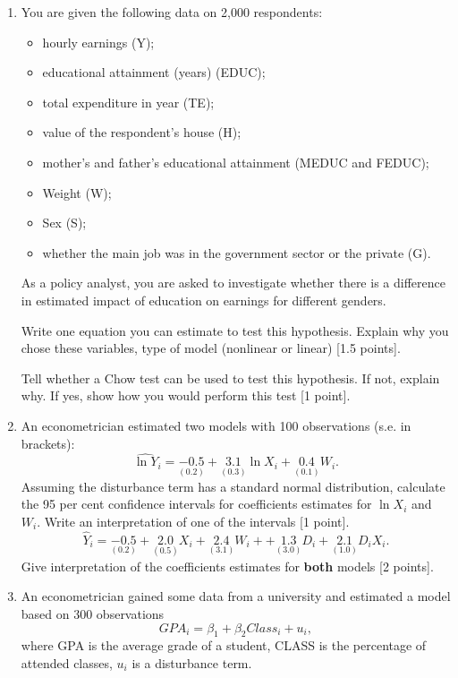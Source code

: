 \begin{enumerate}
\item You are given the following data on 2,000 respondents:
\begin{itemize}
    \item  hourly earnings (Y);
    \item  educational attainment (years) (EDUC);
    \item  total expenditure in year (TE);
    \item  value of the respondent’s house (H);
    \item  mother’s and father’s educational attainment (MEDUC and FEDUC);
    \item  Weight (W);
    \item  Sex (S);
    \item whether the main job was in the government sector or the private (G).
\end{itemize}

As a policy analyst, you are asked to investigate whether there is a difference in estimated impact
of education on earnings for different genders.

Write one equation you can estimate to test this hypothesis. Explain why you chose these
variables, type of model (nonlinear or linear) [1.5 points].

Tell whether a Chow test can be used to test this hypothesis. If not, explain why. If yes, show
how you would perform this test [1 point].

\item An econometrician estimated two models with 100 observations (s.e. in brackets):
\[
\widehat{\ln Y}_i = \underset{(0.2)}{-0.5} + \underset{(0.3)}{3.1} \ln X_i + \underset{(0.1)}{0.4} W_i. 
\]
Assuming the disturbance term has a standard normal distribution, calculate the 95 per cent
confidence intervals for coefficients estimates for $\ln X_i$ and $W_i$. 
Write an interpretation of one of the intervals [1 point].
\[
    \hat{Y}_i = \underset{(0.2)}{-0.5} + \underset{(0.5)}{2.0} X_i + \underset{(3.1)}{2.4} W_i + + \underset{(3.0)}{1.3} D_i + \underset{(1.0)}{2.1} D_i X_i.     
\]
Give interpretation of the coefficients estimates for \textbf{both} models [2 points].

\item An econometrician gained some data from a university and estimated a model based on 300
observations
\[
GPA_i = \beta_1 + \beta_2 Class_i + u_i,
\]
where GPA is the average grade of a student, CLASS is the percentage of attended classes, $u_i$ is a
disturbance term.


\end{enumerate}
